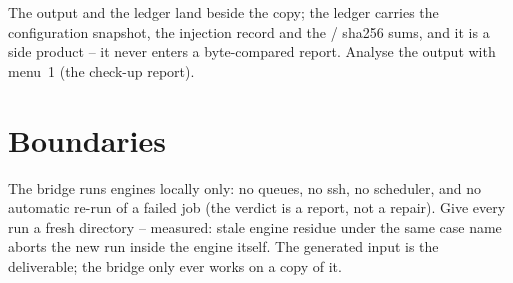 The output and the  ledger land beside the
copy; the ledger carries the configuration snapshot, the injection
record and the / sha256 sums, and it is a side
product -- it never enters a byte-compared report.  Analyse the output
with menu~1 (the check-up report).

\section{Boundaries}

The bridge runs engines locally only: no queues, no ssh, no scheduler,
and no automatic re-run of a failed job (the verdict is a report, not a
repair).  Give every run a fresh directory -- measured: stale engine
residue under the same case name aborts the new run inside the engine
itself.  The generated input is the deliverable; the bridge only ever
works on a copy of it.
